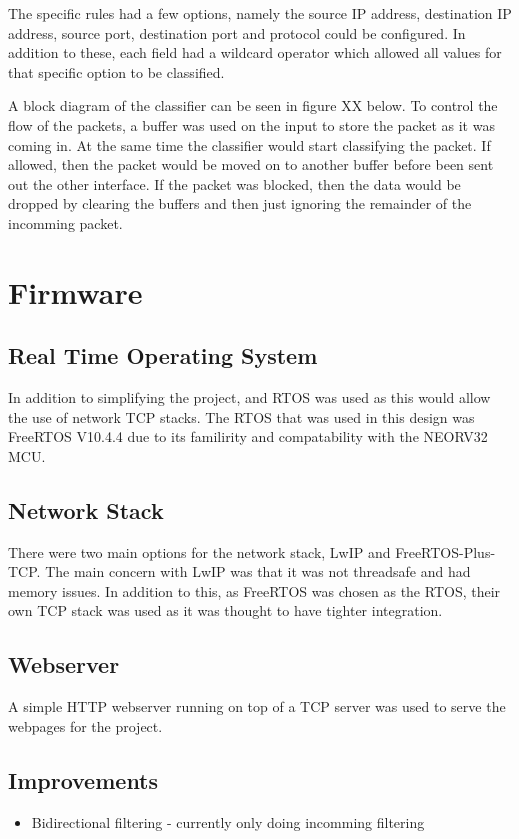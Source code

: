 The specific rules had a few options, namely the source IP address, destination IP address, source port, destination port and protocol could be configured. In addition to these, each field had a wildcard operator which allowed all values for that specific option to be classified. 

A block diagram of the classifier can be seen in figure XX below. To control the flow of the packets, a buffer was used on the input to store the packet as it was coming in. At the same time the classifier would start classifying the packet. If allowed, then the packet would be moved on to another buffer before been sent out the other interface. If the packet was blocked, then the data would be dropped by clearing the buffers and then just ignoring the remainder of the incomming packet. 





\section{Firmware}

\subsection{Real Time Operating System}
In addition to simplifying the project, and RTOS was used as this would allow the use of network TCP stacks. The RTOS that was used in this design was FreeRTOS V10.4.4 due to its familirity and compatability with the NEORV32 MCU.


\subsection{Network Stack}
There were two main options for the network stack, LwIP and FreeRTOS-Plus-TCP. The main concern with LwIP was that it was not threadsafe and had memory issues. In addition to this, as FreeRTOS was chosen as the RTOS, their own TCP stack was used as it was thought to have tighter integration. 


\subsection{Webserver}
A simple HTTP webserver running on top of a TCP server was used to serve the webpages for the project. 


\subsection{Improvements}

\begin{itemize}
    \item Bidirectional filtering - currently only doing incomming filtering
\end{itemize}